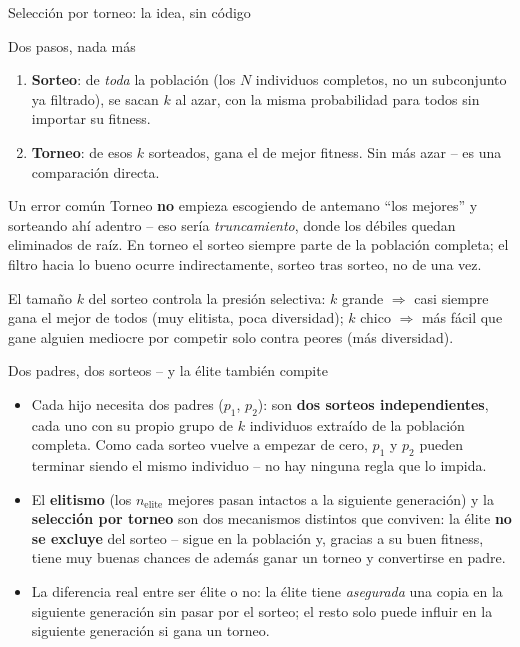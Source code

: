 \documentclass[aspectratio=169,10pt]{beamer}
\begin{document}
\begin{frame}{Selección por torneo: la idea, sin código}
  \begin{block}{Dos pasos, nada más}
    \begin{enumerate}
      \item \textbf{Sorteo}: de \emph{toda} la población (los $N$
        individuos completos, no un subconjunto ya filtrado), se sacan
        $k$ al azar, con la misma probabilidad para todos sin importar
        su fitness.
      \item \textbf{Torneo}: de esos $k$ sorteados, gana el de mejor
        fitness. Sin más azar -- es una comparación directa.
    \end{enumerate}
  \end{block}
  \begin{alertblock}{Un error común}
    Torneo \textbf{no} empieza escogiendo de antemano ``los mejores'' y
    sorteando ahí adentro -- eso sería \emph{truncamiento}, donde los
    débiles quedan eliminados de raíz. En torneo el sorteo siempre parte
    de la población completa; el filtro hacia lo bueno ocurre
    indirectamente, sorteo tras sorteo, no de una vez.
  \end{alertblock}
  El tamaño $k$ del sorteo controla la presión selectiva: $k$ grande
  $\Rightarrow$ casi siempre gana el mejor de todos (muy elitista, poca
  diversidad); $k$ chico $\Rightarrow$ más fácil que gane alguien
  mediocre por competir solo contra peores (más diversidad).
\end{frame}

\begin{frame}{Dos padres, dos sorteos -- y la élite también compite}
  \begin{itemize}
    \item Cada hijo necesita dos padres ($p_1$, $p_2$): son
      \textbf{dos sorteos independientes}, cada uno con su propio
      grupo de $k$ individuos extraído de la población completa. Como
      cada sorteo vuelve a empezar de cero, $p_1$ y $p_2$ pueden
      terminar siendo el mismo individuo -- no hay ninguna regla que lo
      impida.
    \item El \textbf{elitismo} (los $n_{\text{elite}}$ mejores pasan
      intactos a la siguiente generación) y la \textbf{selección por
      torneo} son dos mecanismos distintos que conviven: la élite
      \textbf{no se excluye} del sorteo -- sigue en la población y,
      gracias a su buen fitness, tiene muy buenas chances de además
      ganar un torneo y convertirse en padre.
    \item La diferencia real entre ser élite o no: la élite tiene
      \emph{asegurada} una copia en la siguiente generación sin pasar
      por el sorteo; el resto solo puede influir en la siguiente
      generación si gana un torneo.
  \end{itemize}
\end{frame}
\end{document}
